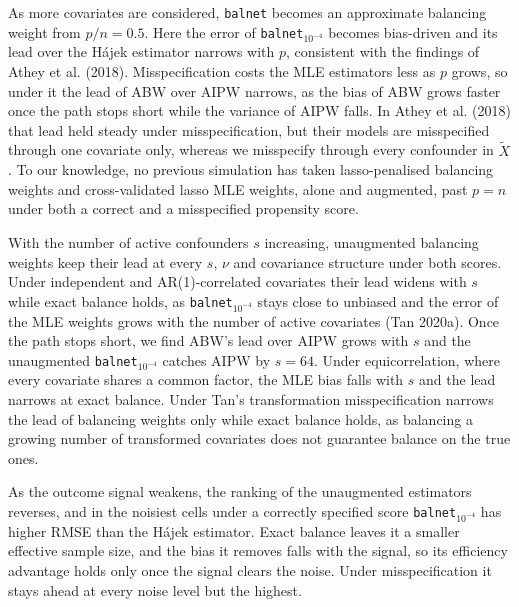 \documentclass[
  12pt,
  a4paper,
]{article}
\begin{document}
As more covariates are considered, \texttt{balnet} becomes an
approximate balancing weight from \(p/n = 0.5\). Here the error of
\texttt{balnet}\(_{10^{-4}}\) becomes bias-driven and its lead over the
Hájek estimator narrows with \(p\), consistent with the findings of
Athey et al. (2018). Misspecification costs the MLE estimators less as
\(p\) grows, so under it the lead of ABW over AIPW narrows, as the bias
of ABW grows faster once the path stops short while the variance of AIPW
falls. In Athey et al. (2018) that lead held steady under
misspecification, but their models are misspecified through one
covariate only, whereas we misspecify through every confounder in
\(\tilde X\). To our knowledge, no previous simulation has taken
lasso-penalised balancing weights and cross-validated lasso MLE weights,
alone and augmented, past \(p = n\) under both a correct and a
misspecified propensity score.

With the number of active confounders \(s\) increasing, unaugmented
balancing weights keep their lead at every \(s\), \(\nu\) and covariance
structure under both scores. Under independent and AR(1)-correlated
covariates their lead widens with \(s\) while exact balance holds, as
\texttt{balnet}\(_{10^{-4}}\) stays close to unbiased and the error of
the MLE weights grows with the number of active covariates (Tan 2020a).
Once the path stops short, we find ABW's lead over AIPW grows with \(s\)
and the unaugmented \texttt{balnet}\(_{10^{-4}}\) catches AIPW by
\(s = 64\). Under equicorrelation, where every covariate shares a common
factor, the MLE bias falls with \(s\) and the lead narrows at exact
balance. Under Tan's transformation misspecification narrows the lead of
balancing weights only while exact balance holds, as balancing a growing
number of transformed covariates does not guarantee balance on the true
ones.

As the outcome signal weakens, the ranking of the unaugmented estimators
reverses, and in the noisiest cells under a correctly specified score
\texttt{balnet}\(_{10^{-4}}\) has higher RMSE than the Hájek estimator.
Exact balance leaves it a smaller effective sample size, and the bias it
removes falls with the signal, so its efficiency advantage holds only
once the signal clears the noise. Under misspecification it stays ahead
at every noise level but the highest.
\end{document}
